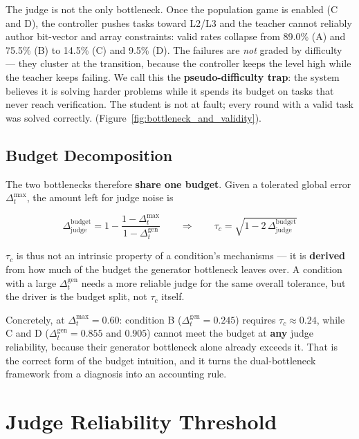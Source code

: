 \documentclass{article}
\begin{document}
The judge is not the only bottleneck. Once the population game is enabled (C and D), the controller
pushes tasks toward L2/L3 and the teacher cannot reliably author bit-vector and array constraints:
valid rates collapse from 89.0\% (A) and 75.5\% (B) to 14.5\% (C) and 9.5\% (D). The failures are
\textit{not} graded by difficulty --- they cluster at the transition, because the controller keeps the
level high while the teacher keeps failing. We call this the \textbf{pseudo-difficulty trap}: the
system believes it is solving harder problems while it spends its budget on tasks that never reach
verification. The student is not at fault; every round with a valid task was solved correctly.
(Figure~\ref{fig:bottleneck_and_validity}).

\subsection{Budget Decomposition}

The two bottlenecks therefore \textbf{share one budget}. Given a tolerated global error
$\Delta_t^{\max}$, the amount left for judge noise is

\[
  \Delta_{\mathrm{judge}}^{\mathrm{budget}} = 1 - \frac{1-\Delta_t^{\max}}{1-\Delta_t^{\mathrm{gen}}}
  \qquad\Longrightarrow\qquad
  \tau_c = \sqrt{1 - 2\,\Delta_{\mathrm{judge}}^{\mathrm{budget}}}
\]

$\tau_c$ is thus not an intrinsic property of a condition's mechanisms --- it is \textbf{derived}
from how much of the budget the generator bottleneck leaves over. A condition with a large
$\Delta_t^{\mathrm{gen}}$ needs a more reliable judge for the same overall tolerance, but the driver is
the budget split, not $\tau_c$ itself.

Concretely, at $\Delta_t^{\max} = 0.60$: condition B ($\Delta_t^{\mathrm{gen}} = 0.245$) requires
$\tau_c \approx 0.24$, while C and D ($\Delta_t^{\mathrm{gen}} = 0.855$ and $0.905$) cannot meet the
budget at \textbf{any} judge reliability, because their generator bottleneck alone already exceeds
it. That is the correct form of the budget intuition, and it turns the dual-bottleneck framework from a
diagnosis into an accounting rule.

\section{Judge Reliability Threshold}
\label{sec:judge}
\end{document}
